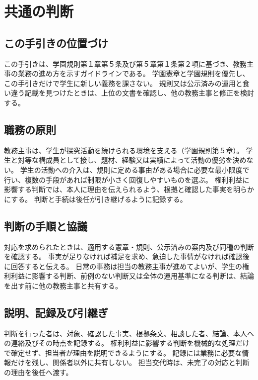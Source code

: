 ﻿\newpage
\chapter{共通の判断}

\section{この手引きの位置づけ}

この手引きは、学園規則第１章第５条及び第５章第１条第２項に基づき、教務主事の業務の進め方を示すガイドラインである。
学園憲章と学園規則を優先し、この手引きだけで学生に新しい義務を課さない。
規則又は公示済みの運用と食い違う記載を見つけたときは、上位の文書を確認し、他の教務主事と修正を検討する。

\section{職務の原則}

教務主事は、学生が探究活動を続けられる環境を支える（学園規則第５章）。
学生と対等な構成員として接し、題材、経験又は実績によって活動の優劣を決めない。
学生の活動への介入は、規則に定める事由がある場合に必要な最小限度で行い、複数の手段があれば制限が小さく回復しやすいものを選ぶ。
権利利益に影響する判断では、本人に理由を伝えられるよう、根拠と確認した事実を明らかにする。
判断と手続は後任が引き継げるように記録する。

\section{判断の手順と協議}

対応を求められたときは、適用する憲章・規則、公示済みの案内及び同種の判断を確認する。
事実が足りなければ補足を求め、急迫した事情がなければ確認後に回答すると伝える。
日常の事務は担当の教務主事が進めてよいが、学生の権利利益に影響する判断、前例のない判断又は全体の運用基準になる判断は、結論を出す前に他の教務主事と共有する。

\section{説明、記録及び引継ぎ}

判断を行った者は、対象、確認した事実、根拠条文、相談した者、結論、本人への連絡及びその時点を記録する。
権利利益に影響する判断を機械的な処理だけで確定せず、担当者が理由を説明できるようにする。
記録には業務に必要な情報だけを残し、関係者以外に共有しない。
担当交代時は、未完了の対応と判断の理由を後任へ渡す。
